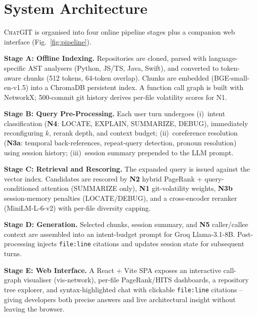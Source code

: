 \documentclass[runningheads]{llncs}
\newcommand{\chatgit}{\textsc{ChatGIT}\xspace}
\begin{document}
\section{System Architecture}
\label{sec:architecture}

\chatgit is organised into four online pipeline stages plus a companion web
interface (Fig.~\ref{fig:pipeline}).

\textbf{Stage A: Offline Indexing.} Repositories are cloned, parsed with
language-specific AST analysers (Python, JS/TS, Java, Swift), and converted
to token-aware chunks (512 tokens, 64-token overlap). Chunks are embedded
(BGE-small-en-v1.5) into a ChromaDB persistent index. A function call graph
is built with NetworkX; 500-commit git history derives per-file volatility
scores for N1.

\textbf{Stage B: Query Pre-Processing.} Each user turn undergoes
(i)~intent classification (\textbf{N4}: LOCATE, EXPLAIN, SUMMARIZE, DEBUG),
immediately reconfiguring $k$, rerank depth, and context budget;
(ii)~coreference resolution (\textbf{N3a}: temporal back-references,
repeat-query detection, pronoun resolution) using session history;
(iii)~session summary prepended to the LLM prompt.

\textbf{Stage C: Retrieval and Rescoring.} The expanded query is issued
against the vector index. Candidates are rescored by \textbf{N2} hybrid
PageRank + query-conditioned attention (SUMMARIZE only), \textbf{N1}
git-volatility weights, \textbf{N3b} session-memory penalties (LOCATE/DEBUG),
and a cross-encoder reranker (MiniLM-L-6-v2) with per-file diversity capping.

\textbf{Stage D: Generation.} Selected chunks, session summary, and
\textbf{N5} caller/callee context are assembled into an intent-budget prompt
for Groq Llama-3.1-8B. Post-processing injects \texttt{file:line} citations
and updates session state for subsequent turns.

\textbf{Stage E: Web Interface.} A React + Vite SPA exposes an interactive
call-graph visualiser (vis-network), per-file PageRank/HITS dashboards, a
repository tree explorer, and syntax-highlighted chat with clickable
\texttt{file:line} citations -- giving developers both precise answers and
live architectural insight without leaving the browser.
\end{document}
